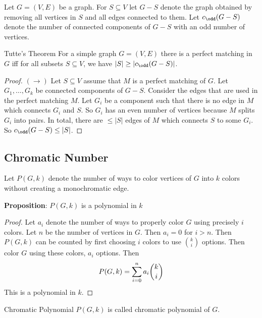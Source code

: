 \documentclass{report}
\begin{document}
Let $G = (V, E)$ be a graph. For $S \subseteq V$ let $G - S$ denote the graph obtained by removing all vertices in $S$ and all edges connected to them. Let $c_{\odd} (G - S)$ denote the number of connected components of $G - S$ with an odd number of vertices.

\begin{theorem}{Tutte's Theorem}
    For a simple graph $G = (V, E)$ there is a perfect matching in $G$ iff for all subsets $S \subseteq V$, we have $\lvert S \rvert \geq \lvert c_{ \odd} (G - S) \rvert$.
\end{theorem}
    \begin{proof}
        $(\rightarrow)$ Let $S \subseteq V$ assume that $M$ is a perfect matching of $G$. Let $G_{1}, \ldots, G_{k}$ be connected components of $G - S$. Consider the edges that are used in the perfect matching $M$. Let $G_{i}$ be a component such that there is no edge in $M$ which connects $G_{i}$ and $S$. So $G_{i}$ has an even number of vertices because $M$ splits $G_{i}$ into pairs. In total, there are $\leq \lvert S \rvert$ edges of $M$ which connects $S$ to some $G_{i}$. So $c_{ \odd} (G - S) \leq \lvert S \rvert$.
    \end{proof}

\begin{topic}
    \section{Chromatic Number}
\end{topic}

Let $P(G, k)$ denote the number of ways to color vertices of $G$ into $k$ colors without creating a monochromatic edge. 

\textbf{Proposition}: $P(G, k)$ is a polynomial in $k$
    \begin{proof}
        Let $a_{i}$ denote the number of ways to properly color $G$ using precisely $i$ colors. Let $n$ be the number of vertices in $G$. Then $a_{i} = 0$ for $i > n$. Then $P(G, k)$ can be counted by first choosing $i$ colors to use $\binom{k}{i}$ options. Then color $G$ using these colors, $a_{i}$ options. Then
            \begin{equation*}
                P(G, k) = \sum_{i = 0}^{n}a_{i}\dbinom{k}{i}
            \end{equation*}
        This is a polynomial in $k$. 
    \end{proof}

\begin{definition}{Chromatic Polynomial}
    $P(G, k)$ is called chromatic polynomial of $G$.
\end{definition}
\end{document}
